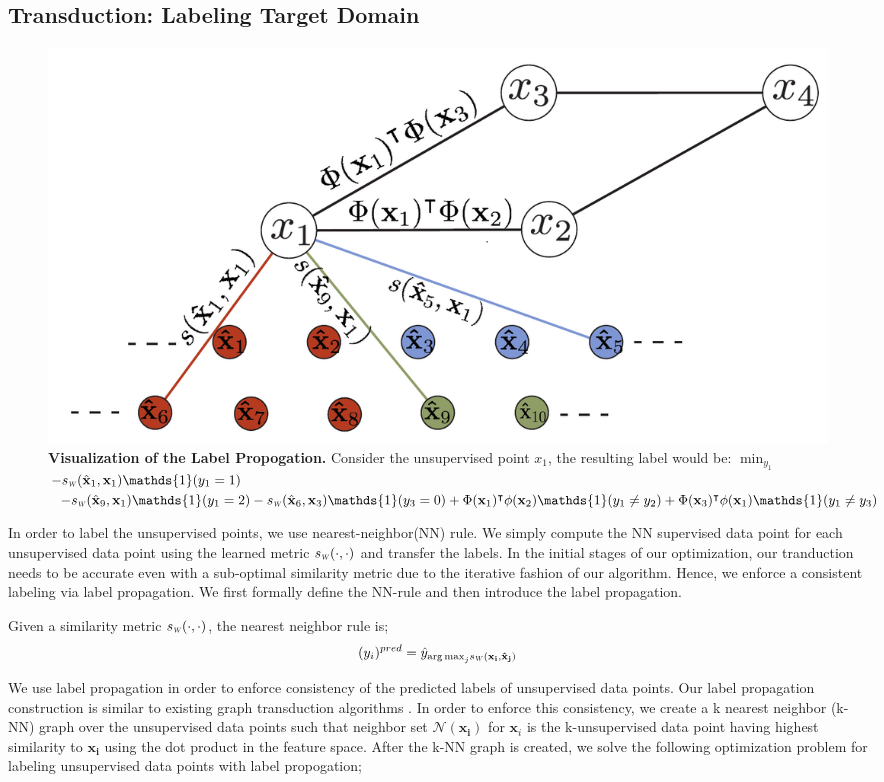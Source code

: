 \subsection{Transduction: Labeling Target Domain}
\label{label}
\begin{figure}[ht]
\includegraphics[width=\columnwidth]{figure3}
\caption{\textbf{Visualization of the Label Propogation.} Consider the unsupervised point $x_1$, the  resulting label would be: $\min_{y_1}$ \mbox{$-\sw(\hat{\mathbf{x}}_1,\mathbf{x}_1)\mathds{1}(y_1=1)$} $-\sw(\hat{\mathbf{x}}_{9},\mathbf{x}_1)\mathds{1}(y_1=2) -\sw(\hat{\mathbf{x}}_{6},\mathbf{x}_3)\mathds{1}(y_3=0) + \Phi(\mathbf{x}_1)^\intercal\phi(\mathbf{x}_2)\mathds{1}(y_1 \neq y_2) +\Phi(\mathbf{x}_3)^\intercal\phi(\mathbf{x}_1)\mathds{1}(y_1 \neq y_3)$}
\label{vis_label_prop}
\end{figure}
In order to label the unsupervised points, we use nearest-neighbor(NN) rule. We simply compute the NN supervised data point for each unsupervised data point using the learned metric $\sw(\cdot,\cdot)$ and transfer the labels. In the initial stages of our optimization, our tranduction needs to be accurate even with a sub-optimal similarity metric due to the iterative fashion of our algorithm. Hence, we enforce a consistent labeling via label propagation. We first formally define the NN-rule and then introduce the label propagation.

Given a similarity metric $\sw(\cdot,\cdot)$, the nearest neighbor rule is;
\begin{equation}
(y_i)^{pred} = \hat{y}_{{\arg\max}_j \sw(\mathbf{x_i}, \mathbf{\hat{x}_j})}
\end{equation}

We use label propagation in order to enforce consistency of the predicted labels of unsupervised data points. Our label propagation construction is similar to existing graph transduction algorithms \cite{label_prop1,label_prop2}. In order to enforce this consistency, we create a k nearest neighbor (k-NN) graph over the unsupervised data points such that neighbor set $\mathcal{N}(\mathbf{x_i})$ for $\mathbf{x}_i$ is the k-unsupervised data point having highest similarity to $\mathbf{x_i}$ using the dot product in the feature space. After the k-NN graph is created, we solve the following optimization problem for labeling unsupervised data points with label propogation;

